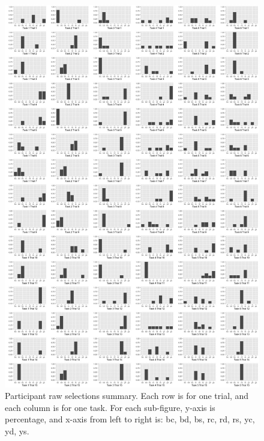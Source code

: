 \documentclass{article}
\begin{document}
\newpage
\begin{figure}
  \centering
  \includegraphics[width=.85\linewidth]{trials}
  \caption{Participant raw selections summary. Each row is for one trial, and each column is for one task. For each sub-figure, y-axis is percentage, and x-axis from left to right is: bc, bd, bs, rc, rd, rs, yc, yd, ys.}
\end{figure}
\end{document}
